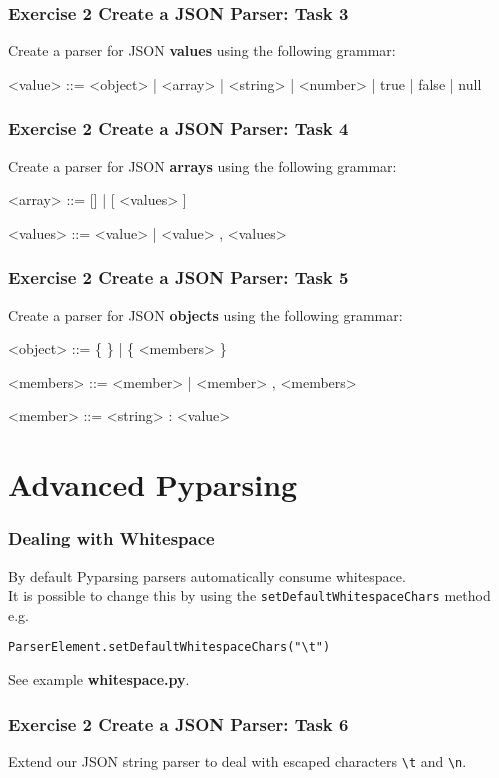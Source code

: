 \documentclass{beamer}
\newcommand*{\escape}[1]{\texttt{\textbackslash#1}}
\begin{document}
\begin{frame}[fragile]
\frametitle{Exercise 2 Create a JSON Parser: Task 3}
Create a parser for JSON \textbf{values} using the following grammar:
\medskip
\begin{grammar}
<value> ::= <object> | <array> | <string> | <number> | true | false | null
\end{grammar}
\end{frame}

\begin{frame}[fragile]
\frametitle{Exercise 2 Create a JSON Parser: Task 4}
Create a parser for JSON \textbf{arrays} using the following grammar:
\medskip
\begin{grammar}
<array> ::= [] | [ <values> ]

<values> ::= <value> | <value> , <values>
\end{grammar}
\end{frame}


\begin{frame}[fragile]
\frametitle{Exercise 2 Create a JSON Parser: Task 5}
Create a parser for JSON \textbf{objects} using the following grammar:
\medskip
\begin{grammar}
<object> ::= \{ \} | \{ <members> \}

<members> ::= <member> | <member> , <members>

<member> ::= <string> : <value>
\end{grammar}
\end{frame}

\section{Advanced Pyparsing}

\begin{frame}[fragile]
\frametitle{Dealing with Whitespace}
By default Pyparsing parsers automatically consume whitespace. \\
\medskip
It is possible to change this by using the \texttt{setDefaultWhitespaceChars} method e.g. \\
\medskip
\begin{verbatim}
ParserElement.setDefaultWhitespaceChars("\t")
\end{verbatim}
\bigskip
See example \textbf{whitespace.py}.

\end{frame}


\begin{frame}[fragile]
\frametitle{Exercise 2 Create a JSON Parser: Task 6}
Extend our JSON string parser to deal with escaped characters \escape{t} and \escape{n}.
\end{frame}
\end{document}

